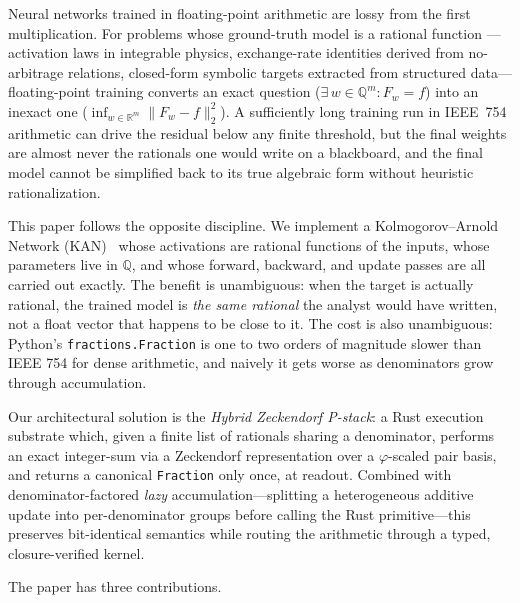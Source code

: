 \documentclass[11pt,a4paper]{article}
\begin{document}
Neural networks trained in floating-point arithmetic are lossy from the first
multiplication. For problems whose ground-truth model is a rational function
---activation laws in integrable physics, exchange-rate identities derived
from no-arbitrage relations, closed-form symbolic targets extracted from
structured data---floating-point training converts an exact question
($\exists\, w \in \mathbb{Q}^{m} : F_{w}=f$) into an inexact one
($\inf_{w \in \mathbb{R}^{m}} \| F_{w} - f \|_{2}^{2}$). A sufficiently long
training run in IEEE~754 arithmetic can drive the residual below any finite
threshold, but the final weights are almost never the rationals one would
write on a blackboard, and the final model cannot be simplified back to its
true algebraic form without heuristic rationalization.

This paper follows the opposite discipline. We implement a
Kolmogorov--Arnold Network (KAN)~\cite{liu2024kan,kolmogorov1957,arnold1959}
whose activations are rational functions of the inputs, whose parameters live
in $\mathbb{Q}$, and whose forward, backward, and update passes are all
carried out exactly. The benefit is unambiguous: when the target is actually
rational, the trained model is \emph{the same rational} the analyst would
have written, not a float vector that happens to be close to it. The cost is
also unambiguous: Python's \texttt{fractions.Fraction} is one to two orders of
magnitude slower than IEEE 754 for dense arithmetic, and naively it gets
worse as denominators grow through accumulation.

Our architectural solution is the \emph{Hybrid Zeckendorf P-stack}: a Rust
execution substrate which, given a finite list of rationals sharing a
denominator, performs an exact integer-sum via a Zeckendorf representation
over a $\varphi$-scaled pair basis, and returns a canonical
\texttt{Fraction} only once, at readout. Combined with denominator-factored
\emph{lazy} accumulation---splitting a heterogeneous additive update into
per-denominator groups before calling the Rust primitive---this preserves
bit-identical semantics while routing the arithmetic through a typed,
closure-verified kernel.

The paper has three contributions.
\end{document}
